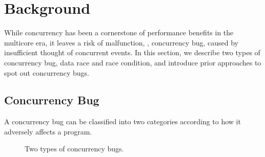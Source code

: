 \section{Background}
\label{s:background}

While concurrency has been a cornerstone of performance benefits in
the multicore era, it leaves a risk of malfunction, \ie, concurrency
bug, caused by insufficient thought of concurrent events.
%
In this section, we describe two types of concurrency bug, data race
and race condition, and introduce prior approaches to spot out
concurrency bugs.

\subsection{Concurrency Bug}
\label{ss:concurrencybugs}

A concurrency bug can be classified into two categories according to
how it adversely affects a program.

\begin{figure}
  \centering
  \hfill
  \caption{Two types of concurrency bugs.}
  \label{fig:concurrencybugs}
\end{figure}  



